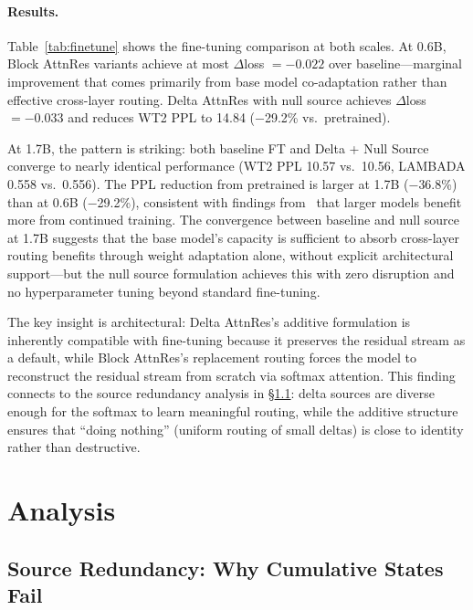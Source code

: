 \documentclass{article}
\begin{document}
\paragraph{Results.} Table~\ref{tab:finetune} shows the fine-tuning comparison at both scales. At 0.6B, Block AttnRes variants achieve at most $\Delta$loss $= -0.022$ over baseline---marginal improvement that comes primarily from base model co-adaptation rather than effective cross-layer routing. Delta AttnRes with null source achieves $\Delta$loss $= -0.033$ and reduces WT2 PPL to 14.84 ($-$29.2\% vs.\ pretrained).

At 1.7B, the pattern is striking: both baseline FT and Delta + Null Source converge to nearly identical performance (WT2 PPL 10.57 vs.\ 10.56, LAMBADA 0.558 vs.\ 0.556). The PPL reduction from pretrained is larger at 1.7B ($-$36.8\%) than at 0.6B ($-$29.2\%), consistent with findings from~\citet{kimi2025attention} that larger models benefit more from continued training. The convergence between baseline and null source at 1.7B suggests that the base model's capacity is sufficient to absorb cross-layer routing benefits through weight adaptation alone, without explicit architectural support---but the null source formulation achieves this with zero disruption and no hyperparameter tuning beyond standard fine-tuning.

The key insight is architectural: Delta AttnRes's additive formulation is inherently compatible with fine-tuning because it preserves the residual stream as a default, while Block AttnRes's replacement routing forces the model to reconstruct the residual stream from scratch via softmax attention. This finding connects to the source redundancy analysis in \S\ref{sec:redundancy}: delta sources are diverse enough for the softmax to learn meaningful routing, while the additive structure ensures that ``doing nothing'' (uniform routing of small deltas) is close to identity rather than destructive.

\section{Analysis}
\label{sec:analysis}

\subsection{Source Redundancy: Why Cumulative States Fail}
\label{sec:redundancy}
\end{document}
